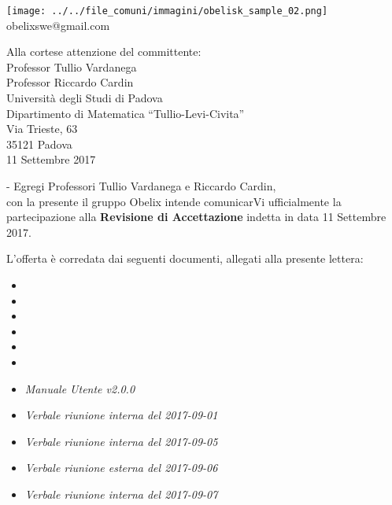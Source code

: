 \documentclass[10 pt,a4paper]{article}
\begin{document}
\begin{minipage}[adjusting]{.3\textwidth}
  \begin{centering}
    \texttt{[image: ../../file\_comuni/immagini/obelisk\_sample\_02.png]}
    \\
    obelixswe@gmail.com
  \end{centering}
\end{minipage}


\begin{flushright}
  Alla cortese attenzione del committente: \\
\vspace{0.08in}
  Professor Tullio Vardanega \\
  Professor Riccardo Cardin \\
  Università degli Studi di Padova \\
  Dipartimento di Matematica ``Tullio-Levi-Civita''\\
  Via Trieste, 63 \\
  35121 Padova \\
\vspace{0.08in}
  11 Settembre 2017 \\
\end{flushright}-
\vspace{0.1in}
Egregi Professori Tullio Vardanega e Riccardo Cardin,\\
con la presente il gruppo Obelix intende comunicarVi ufficialmente
la partecipazione alla \textbf{Revisione di Accettazione} indetta in
data 11 Settembre 2017.
\vspace{.05in}

L'offerta è corredata dai seguenti documenti, allegati alla presente
lettera:
\vspace{.1in}
\begin{itemize}
\item \analisideirequisiti
\item \pianodiprogetto
\item \pianodiqualifica
\item \normediprogetto
\item \gloss
\item {}
\item \emph{Manuale Utente v2.0.0}
\item \emph{Verbale riunione interna del 2017-09-01}
\item \emph{Verbale riunione interna del 2017-09-05}
\item \emph{Verbale riunione esterna del 2017-09-06}
\item \emph{Verbale riunione interna del 2017-09-07}
\end{itemize}
\end{document}
